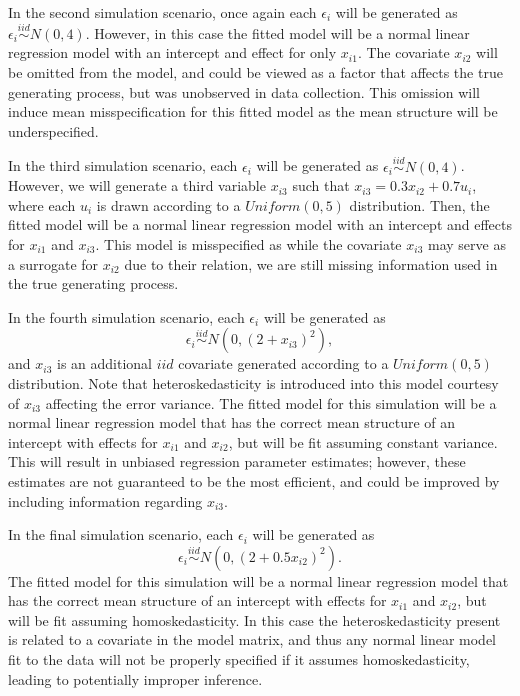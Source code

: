 \documentclass[sn-mathphys-ay]{sn-jnl}
\begin{document}
In the second simulation scenario, once again each $\epsilon_i$ will be generated as $\epsilon_i \stackrel{iid}{\sim} N(0,4)$.
However, in this case the fitted model will be a normal linear regression model with an intercept and effect for only
$x_{i1}$. The covariate $x_{i2}$ will be omitted from the model, and could be viewed as a factor that affects the true generating process, but
was unobserved in data collection. This omission will induce mean misspecification for this fitted model as the mean structure will be underspecified.

In the third simulation scenario, each $\epsilon_i$ will be generated as $\epsilon_i \stackrel{iid}{\sim} N(0,4)$. 
However, we will generate a third variable $x_{i3}$ such that $x_{i3} = 0.3 x_{i2} + 0.7 u_i$, where each $u_i$ is drawn according to a $Uniform(0,5)$ distribution.
Then, the fitted model will be a normal linear regression model with an intercept and effects for $x_{i1}$ and $x_{i3}$. This model is misspecified as while the covariate $x_{i3}$ 
may serve as a surrogate for $x_{i2}$ due to their relation, we are still missing information used in the true generating process.

In the fourth simulation scenario, each $\epsilon_i$ will be generated as
\[ \epsilon_i \stackrel{iid}{\sim} N \left( 0,(2 + x_{i3})^2 \right) ,\]
and $x_{i3}$ is an additional $iid$ covariate
generated according to a $Uniform(0,5)$ distribution. Note that heteroskedasticity is introduced into this model courtesy of $x_{i3}$ affecting the error variance. The fitted model for
this simulation will be a normal linear regression model that has the correct mean structure of an intercept with effects for $x_{i1}$ and $x_{i2}$, but will be fit assuming constant variance.
This will result in unbiased regression parameter estimates; however, these estimates are not guaranteed to be the most efficient, and could be improved by including information regarding $x_{i3}$.

In the final simulation scenario, each $\epsilon_i$ will be generated as
\[\epsilon_i \stackrel{iid}{\sim} N \left( 0,(2 + 0.5 x_{i2})^2 \right).\] The fitted model for this simulation will be a normal linear regression model that has the correct mean structure of an intercept with effects for $x_{i1}$ and $x_{i2}$,
but will be fit assuming homoskedasticity. In this case the heteroskedasticity present is related to a covariate in the model matrix, and thus any normal linear model fit to the data will not be properly
specified if it assumes homoskedasticity, leading to potentially improper inference.
\end{document}
